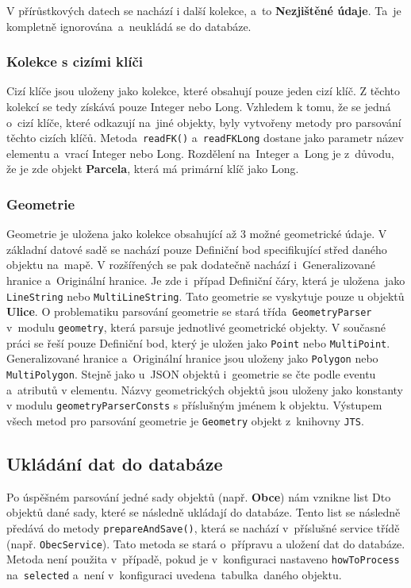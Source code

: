 V přírůstkových datech se nachází i další kolekce, a~to \textbf{Nezjištěné údaje}.
Ta~je kompletně ignorována~a~neukládá se do databáze.

\subsubsection*{Kolekce s cizími klíči}
Cizí klíče jsou uloženy jako kolekce, které obsahují pouze jeden cizí klíč.
Z těchto kolekcí se tedy získává pouze Integer nebo Long.
Vzhledem k tomu, že se jedná o~cizí klíče, které odkazují na~jiné objekty,
byly vytvořeny metody pro parsování těchto cizích klíčů.
Metoda~\texttt{readFK()} a~\texttt{readFKLong} dostane jako parametr název elementu a~vrací Integer nebo Long.
Rozdělení na~Integer a~Long je z~důvodu, že je zde objekt \textbf{Parcela}, která má primární klíč jako Long.

\subsubsection*{Geometrie}
Geometrie je uložena jako kolekce obsahující až 3 možné geometrické údaje.
V základní datové sadě se nachází pouze Definiční bod specifikující střed daného objektu na~mapě.
V rozšířených se pak dodatečně nachází i~Generalizované hranice a~Originální hranice.
Je zde i~případ Definiční čáry, která je uložena~jako \texttt{LineString} nebo \texttt{MultiLineString}.
Tato geometrie se vyskytuje pouze u objektů \textbf{Ulice}.
O problematiku parsování geometrie se stará třída~\texttt{GeometryParser} v~modulu \texttt{geometry}, která parsuje jednotlivé geometrické objekty.
V současné práci se řeší pouze Definiční bod, který je uložen jako \texttt{Point} nebo \texttt{MultiPoint}.
Generalizované hranice a~Originální hranice jsou uloženy jako \texttt{Polygon} nebo \texttt{MultiPolygon}.
Stejně jako u~JSON objektů i~geometrie se čte podle eventu a~atributů v elementu.
Názvy geometrických objektů jsou uloženy jako konstanty v modulu \texttt{geometryParserConsts} s příslušným jménem k objektu.
Výstupem všech metod pro parsování geometrie je \texttt{Geometry} objekt z~knihovny \texttt{JTS}.

\subsection{Ukládání dat do databáze}
Po úspěšném parsování jedné sady objektů (např. \textbf{Obce}) nám vznikne list Dto objektů
dané sady, které se následně ukládají do databáze. Tento list se následně předává do metody \texttt{prepareAndSave()},
která se nachází v~příslušné service třídě (např. \texttt{ObecService}).
Tato metoda se stará o~přípravu a uložení dat do databáze.
Metoda není použita v~případě, pokud je v~konfiguraci nastaveno \texttt{howToProcess} \\ na~\texttt{selected}
a~není v~konfiguraci uvedena~tabulka~daného objektu.

